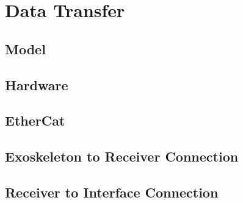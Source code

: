\section{Data Transfer}
\subsection{Model}
\subsection{Hardware}
\subsection{EtherCat}
\subsection{Exoskeleton to Receiver Connection}
\subsection{Receiver to Interface Connection}
